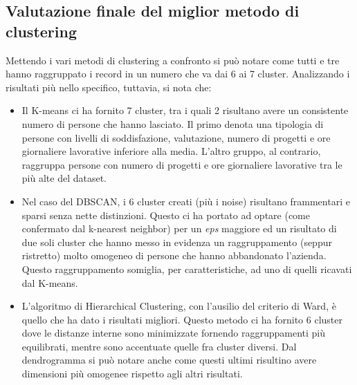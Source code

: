 \subsection{Valutazione finale del miglior metodo di clustering}
	Mettendo i vari metodi di clustering a confronto si può notare come tutti e tre hanno raggruppato i record in un numero che va dai 6 ai 7 cluster.
	Analizzando i risultati più nello specifico, tuttavia, si nota che:
	\begin{itemize}
		\item Il K-means ci ha fornito 7 cluster, tra i quali 2 risultano avere un consistente numero di persone che hanno lasciato. Il primo denota una tipologia di persone con livelli di soddisfazione, valutazione, numero di progetti e ore giornaliere lavorative inferiore alla media. L’altro gruppo, al contrario, raggruppa persone con numero di progetti e ore giornaliere lavorative tra le più alte del dataset.
		\item Nel caso del DBSCAN, i 6 cluster creati (più i noise) risultano frammentari e sparsi senza nette distinzioni. Questo ci ha portato ad optare (come confermato dal k-nearest neighbor) per un \textit{eps} maggiore ed un risultato di due soli cluster che hanno messo in evidenza un raggruppamento (seppur ristretto) molto omogeneo di persone che hanno abbandonato l’azienda. Questo raggruppamento somiglia, per caratteristiche, ad uno di quelli ricavati dal K-means.
		\item L’algoritmo di Hierarchical Clustering, con l’ausilio del criterio di Ward, è quello che ha dato i risultati migliori. Questo metodo ci ha fornito 6 cluster dove le distanze interne sono minimizzate fornendo raggruppamenti più equilibrati, mentre sono accentuate quelle fra cluster diversi. Dal dendrogramma si può notare anche come questi ultimi risultino avere dimensioni più omogenee rispetto agli altri risultati.
	\end{itemize}
	
	

	